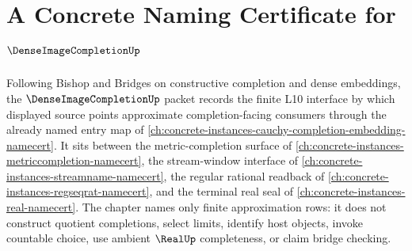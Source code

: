 \chapter{A Concrete Naming Certificate for $\DenseImageCompletionUp$}
\label{ch:concrete-instances-dense-image-completion-namecert}

Following Bishop and Bridges on constructive completion and dense embeddings, the $\DenseImageCompletionUp$ packet records the finite L10 interface by which displayed source points approximate completion-facing consumers through the already named entry map of \autoref{ch:concrete-instances-cauchy-completion-embedding-namecert}. It sits between the metric-completion surface of \autoref{ch:concrete-instances-metriccompletion-namecert}, the stream-window interface of \autoref{ch:concrete-instances-streamname-namecert}, the regular rational readback of \autoref{ch:concrete-instances-regseqrat-namecert}, and the terminal real seal of \autoref{ch:concrete-instances-real-namecert}. The chapter names only finite approximation rows: it does not construct quotient completions, select limits, identify host objects, invoke countable choice, use ambient $\RealUp$ completeness, or claim bridge checking.


